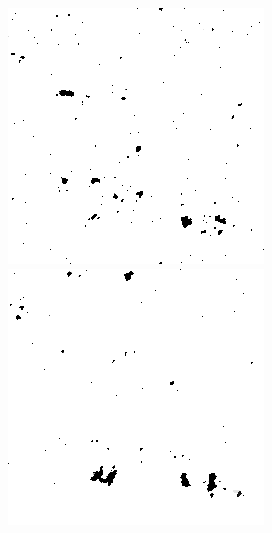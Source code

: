 \begin{figure}[H]
\begin{minipage}[t]{0.245\textwidth}
    \label{fig:noise_5_20}
    \includegraphics[width = \textwidth]{result/noisy/1_5_12.png}
    \label{fig:noise_5_12}
        \includegraphics[width = \textwidth]{result/noisy/1_5_6.png}

\end{minipage}
\end{figure}

